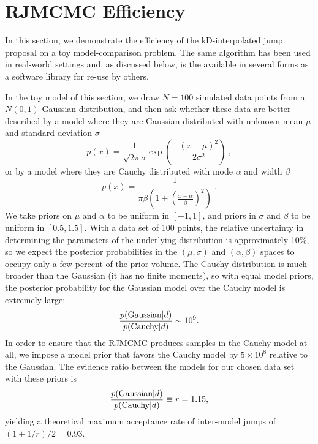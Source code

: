 \documentclass{rsos}
\newcommand{\be}{\begin{equation}}
\newcommand{\ee}{\end{equation}}
\begin{document}
\section{RJMCMC Efficiency}
\label{sec:efficiency}

In this section, we demonstrate the efficiency of the kD-interpolated
jump proposal on a toy model-comparison problem.  The same algorithm
has been used in real-world settings \cite{Farr2010} and, as discussed
below, is the available in several forms as a software library for
re-use by others.

In the toy model of this section, we draw $N = 100$ simulated data
points from a $N(0,1)$ Gaussian distribution, and then ask whether
these data are better described by a model where they are Gaussian
distributed with unknown mean $\mu$ and standard deviation $\sigma$
%
\be
p(x) = \frac{1}{\sqrt{2\pi} \sigma} \exp\left( - \frac{(x-\mu)^2}{2
    \sigma^2} \right)\ ,
\ee
%
or by a model where they are Cauchy distributed with mode $\alpha$
and width $\beta$
%
\be
p(x) = \frac{1}{\pi \beta \left( 1 + \left(\frac{x - \alpha}{\beta}\right)^2\right)}\ .
\ee
%
We take priors on $\mu$ and $\alpha$ to be uniform in $[-1,1]$, and
priors in $\sigma$ and $\beta$ to be uniform in $[0.5, 1.5]$.  With a
data set of 100 points, the relative uncertainty in determining the
parameters of the underlying distribution is approximately 10\%, so we
expect the posterior probabilities in the $(\mu,\sigma)$ and
$(\alpha,\beta)$ spaces to occupy only a few percent of the prior
volume.  The Cauchy distribution is much broader than the Gaussian (it
has no finite moments), so with equal model priors, the posterior
probability for the Gaussian model over the Cauchy model is extremely
large:
%
\be
\frac{p(\textnormal{Gaussian} | d)}{p(\textnormal{Cauchy}|d)} \sim 10^9.
\ee
%
In order to ensure that the RJMCMC produces samples in the Cauchy
model at all, we impose a model prior that favors the Cauchy model by
$5 \times 10^8$ relative to the Gaussian.  The evidence ratio between
the models for our chosen data set with these priors is
%
\be \frac{p(\textnormal{Gaussian} | d)}{p(\textnormal{Cauchy}|d)}
\equiv r = 1.15,
\ee
%
yielding a theoretical maximum acceptance rate of inter-model jumps of
$(1+1/r)/2 = 0.93$.
\end{document}
